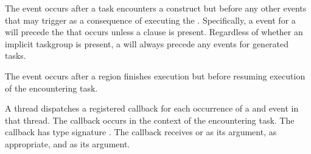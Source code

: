 \events

The  event occurs after a task encounters a
 construct but before any other events that may
trigger as a consequence of executing the .
Specifically, a  event for a 
will precede the  that occurs unless a
 clause is present.  Regardless of whether an implicit
taskgroup is present, a  will always precede
any  events for generated tasks.

The  event occurs after a  region finishes execution
but before resuming execution of the encountering task.

\tools

A thread dispatches a registered 
callback for each occurrence of a  and
 event in that thread. The callback occurs in the
context of the encountering task.  The callback has type signature
. The callback receives
 or 
as its  argument, as appropriate, and
 as its  argument.

